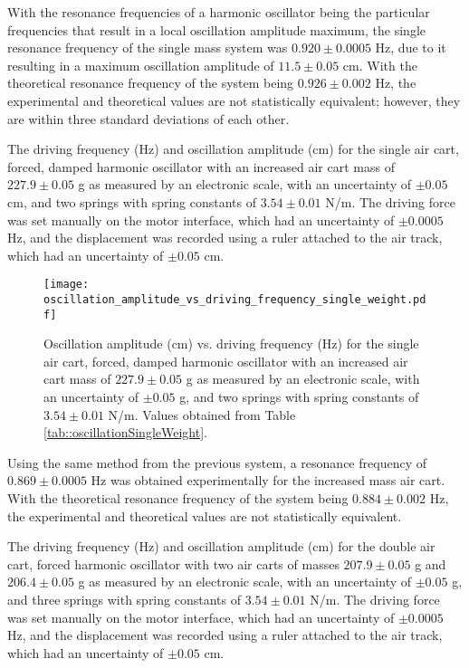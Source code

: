 With the resonance frequencies of a harmonic oscillator being the particular frequencies that result in a local oscillation amplitude maximum, the single resonance frequency of the single mass system was $0.920 \pm 0.0005$ Hz, due to it resulting in a maximum oscillation amplitude of $11.5 \pm 0.05$ cm. With the theoretical resonance frequency of the system being $0.926 \pm 0.002$ Hz, the experimental and theoretical values are not statistically equivalent; however, they are within three standard deviations of each other.

\begin{table}[H]
	\centering
	
	\caption{The driving frequency (Hz) and oscillation amplitude (cm) for the single air cart, forced, damped harmonic oscillator with an increased air cart mass of $227.9 \pm 0.05$ g as measured by an electronic scale, with an uncertainty of $\pm 0.05$ cm, and two springs with spring constants of $3.54 \pm 0.01$ N/m. The driving force was set manually on the motor interface, which had an uncertainty of $\pm 0.0005$ Hz, and the displacement was recorded using a ruler attached to the air track, which had an uncertainty of $\pm 0.05$ cm.}
	\label{tab::oscillationSingleWeight}
\end{table}

\begin{figure}[H]
    \centering
	\texttt{[image: oscillation\_amplitude\_vs\_driving\_frequency\_single\_weight.pdf]}
	\label{fig::resonanceSingleWeight}
	\caption{Oscillation amplitude (cm) vs. driving frequency (Hz) for the single air cart, forced, damped harmonic oscillator with an increased air cart mass of $227.9 \pm 0.05$ g as measured by an electronic scale, with an uncertainty of $\pm 0.05$ g, and two springs with spring constants of $3.54 \pm 0.01$ N/m. Values obtained from Table \ref{tab::oscillationSingleWeight}.}
\end{figure}

Using the same method from the previous system, a resonance frequency of $0.869 \pm 0.0005$ Hz was obtained experimentally for the increased mass air cart. With the theoretical resonance frequency of the system being $0.884 \pm 0.002$ Hz, the experimental and theoretical values are not statistically equivalent.

\begin{table}[H]
	\centering
	
	\caption{The driving frequency (Hz) and oscillation amplitude (cm) for the double air cart, forced harmonic oscillator with two air carts of masses $207.9 \pm 0.05$ g and $206.4 \pm 0.05$ g as measured by an electronic scale, with an uncertainty of $\pm 0.05$ g, and three springs with spring constants of $3.54 \pm 0.01$ N/m. The driving force was set manually on the motor interface, which had an uncertainty of $\pm 0.0005$ Hz, and the displacement was recorded using a ruler attached to the air track, which had an uncertainty of $\pm 0.05$ cm.}
	\label{tab::oscillationDouble}
\end{table}

